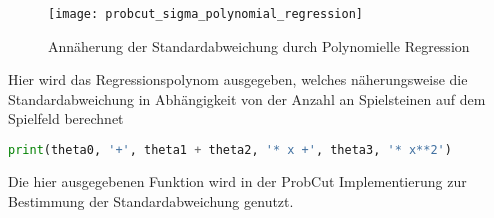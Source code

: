 \begin{figure}[H]
    \centering
    \texttt{[image: probcut\_sigma\_polynomial\_regression]}
    \caption{Annäherung der Standardabweichung durch Polynomielle Regression}
    \label{fig:probcut_sigma_polynomial_regression}
\end{figure}

Hier wird das Regressionspolynom ausgegeben, welches näherungsweise die
Standardabweichung in Abhängigkeit von der Anzahl an Spielsteinen auf
dem Spielfeld berechnet

\begin{lstlisting}[language=Python]
print(theta0, '+', theta1 + theta2, '* x +', theta3, '* x**2')
\end{lstlisting}

Die hier ausgegebenen Funktion wird in der ProbCut Implementierung zur
Bestimmung der Standardabweichung genutzt.
